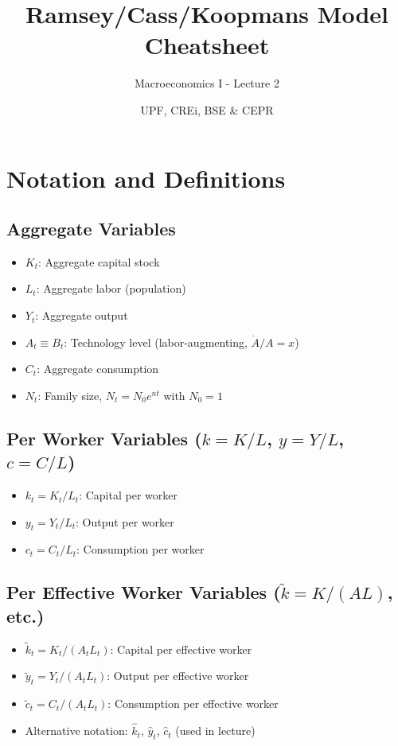 \documentclass[a4paper,11pt]{article}
\title{\textbf{Ramsey/Cass/Koopmans Model Cheatsheet}}
\author{Macroeconomics I - Lecture 2}
\date{UPF, CREi, BSE \& CEPR}
\newcommand{\ktilde}{\tilde{k}}
\newcommand{\ytilde}{\tilde{y}}
\newcommand{\ctilde}{\tilde{c}}
\newcommand{\khat}{\hat{k}}
\newcommand{\ychat}{\hat{y}}
\newcommand{\chat}{\hat{c}}
\begin{document}
\maketitle

\clearpage

\section*{Notation and Definitions}

\subsection*{Aggregate Variables}
\begin{itemize}
    \item $K_t$: Aggregate capital stock
    \item $L_t$: Aggregate labor (population)
    \item $Y_t$: Aggregate output
    \item $A_t \equiv B_t$: Technology level (labor-augmenting, $\dot{A}/A = x$)
    \item $C_t$: Aggregate consumption
    \item $N_t$: Family size, $N_t = N_0 e^{nt}$ with $N_0 = 1$
\end{itemize}

\subsection*{Per Worker Variables ($k = K/L$, $y = Y/L$, $c = C/L$)}
\begin{itemize}
    \item $k_t = K_t / L_t$: Capital per worker
    \item $y_t = Y_t / L_t$: Output per worker
    \item $c_t = C_t / L_t$: Consumption per worker
\end{itemize}

\subsection*{Per Effective Worker Variables ($\tilde{k} = K/(AL)$, etc.)}
\begin{itemize}
    \item $\ktilde_t = K_t / (A_t L_t)$: Capital per effective worker
    \item $\ytilde_t = Y_t / (A_t L_t)$: Output per effective worker
    \item $\ctilde_t = C_t / (A_t L_t)$: Consumption per effective worker
    \item Alternative notation: $\khat_t$, $\ychat_t$, $\chat_t$ (used in lecture)
\end{itemize}
\end{document}
